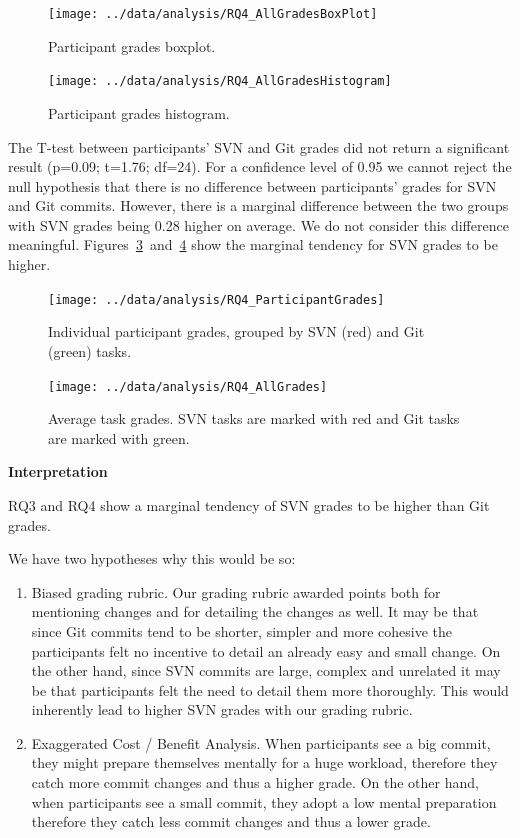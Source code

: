 \documentclass[letterpaper]{article}
\begin{document}
\begin{figure}[H]
    \centering
    \texttt{[image: ../data/analysis/RQ4\_AllGradesBoxPlot]}
    \caption{Participant grades boxplot.}
    \label{fig:rq4-allParticipantsBox}
\end{figure}

\begin{figure}[H]
    \centering
    \texttt{[image: ../data/analysis/RQ4\_AllGradesHistogram]}
    \caption{Participant grades histogram.}
    \label{fig:rq4-allParticipantsHist}
\end{figure}

The T-test between participants' SVN and Git grades did not return a significant result (p=0.09; t=1.76; df=24). 
For a confidence level of 0.95 we cannot reject the null hypothesis that there is no difference between participants' grades for SVN and Git commits.
However, there is a marginal difference between the two groups with SVN grades being 0.28 higher on average.
We do not consider this difference meaningful.
Figures~\ref{fig:rq4-participantGrades}~and~\ref{fig:rq4-taskGrades} show the marginal tendency for SVN grades to be higher.

\begin{figure}[H]
    \centering
    \texttt{[image: ../data/analysis/RQ4\_ParticipantGrades]}
    \caption{Individual participant grades, grouped by SVN (red) and Git (green) tasks.}
    \label{fig:rq4-participantGrades}
\end{figure}

\begin{figure}[H]
    \centering
    \texttt{[image: ../data/analysis/RQ4\_AllGrades]}
    \caption{Average task grades. SVN tasks are marked with red and Git tasks are marked with green.}
    \label{fig:rq4-taskGrades}
\end{figure}

\textbf{Interpretation}

RQ3 and RQ4 show a marginal tendency of SVN grades to be higher than Git grades.

We have two hypotheses why this would be so:
\begin{enumerate}
		\item{Biased grading rubric.}
			Our grading rubric awarded points both for mentioning changes and for detailing the changes as well.
			It may be that since Git commits tend to be shorter, simpler and more cohesive the participants felt no incentive to detail an already easy and small change.
			On the other hand, since SVN commits are large, complex and unrelated it may be that participants felt the need to detail them more thoroughly.
			This would inherently lead to higher SVN grades with our grading rubric.
	\item{Exaggerated Cost / Benefit Analysis.}
			When participants see a big commit, they might prepare themselves mentally for a huge workload, therefore they catch more commit changes and thus a higher grade. 
			On the other hand, when participants see a small commit, they adopt a low mental preparation therefore they catch less commit changes and thus a lower grade.
\end{enumerate}
\end{document}
